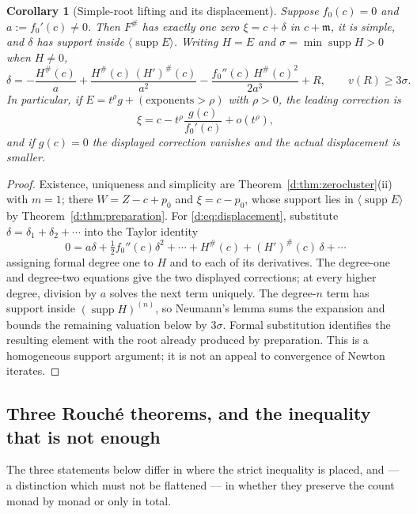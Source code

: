 \documentclass[11pt,a4paper]{article}
\numberwithin{equation}{section}
\newtheorem{corollary}[theorem]{Corollary}
\theoremstyle{definition}
\theoremstyle{remark}
\theoremstyle{plain}
\newcommand{\mm}{\mathfrak m}
\DeclareMathOperator{\supp}{supp}
\newcommand{\tm}{t}
\newcommand{\ev}[1]{#1^{\#}}
\newcommand{\Neu}[1]{\langle #1\rangle}
\begin{document}
\begin{corollary}[Simple-root lifting and its displacement]
\label{d:cor:displacement}
Suppose $f_0(c)=0$ and $a:=f_0'(c)\ne0$.  Then $\ev F$ has exactly one
zero $\xi=c+\delta$ in $c+\mm$, it is simple, and $\delta$ has support
inside $\Neu{\supp E}$.  Writing $H=E$ and
$\sigma=\min\supp H>0$ when $H\ne0$,
\begin{equation}\label{d:eq:displacement}
 \delta=-\frac{\ev H(c)}{a}
       +\frac{\ev H(c)\,\ev{(H')}(c)}{a^{2}}
       -\frac{f_0''(c)\,\ev H(c)^{2}}{2a^{3}}+R,
 \qquad v(R)\ge3\sigma .
\end{equation}
In particular, if $E=\tm^{\rho}g+(\text{exponents}>\rho)$ with
$\rho>0$, the leading correction is
\begin{equation}\label{d:eq:leadingcorrection}
 \xi=c-\tm^{\rho}\frac{g(c)}{f_0'(c)}+o(\tm^{\rho}),
\end{equation}
and if $g(c)=0$ the displayed correction vanishes and the actual
displacement is smaller.
\end{corollary}

\begin{proof}
Existence, uniqueness and simplicity are
Theorem~\ref{d:thm:zerocluster}(ii) with $m=1$; there $W=Z-c+p_0$ and
$\xi=c-p_0$, whose support lies in $\Neu{\supp E}$ by
Theorem~\ref{d:thm:preparation}.  For \eqref{d:eq:displacement},
substitute $\delta=\delta_1+\delta_2+\cdots$ into the Taylor identity
\[
 0=a\delta+\tfrac12f_0''(c)\delta^{2}+\cdots
   +\ev H(c)+\ev{(H')}(c)\,\delta+\cdots
\]
assigning formal degree one to $H$ and to each of its derivatives.  The
degree-one and degree-two equations give the two displayed corrections;
at every higher degree, division by $a$ solves the next term uniquely.
The degree-$n$ term has support inside $(\supp H)^{(n)}$, so Neumann's
lemma sums the expansion and bounds the remaining valuation below by
$3\sigma$.  Formal substitution identifies the resulting element with
the root already produced by preparation.  This is a homogeneous
support argument; it is not an appeal to convergence of Newton
iterates.
\end{proof}

\subsection{Three Rouch\'e theorems, and the inequality that is not enough}
\label{d:sub:rouche}

The three statements below differ in where the strict inequality is
placed, and --- a distinction which must not be flattened --- in whether
they preserve the count monad by monad or only in total.
\end{document}
